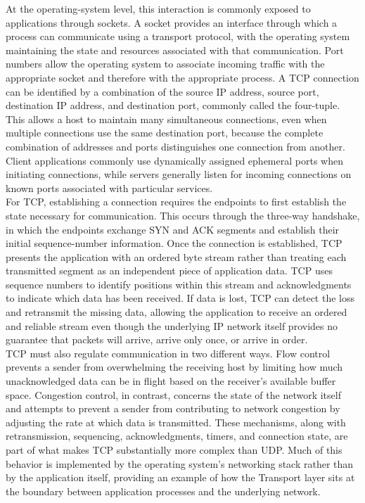 \documentclass[12pt]{article}
\begin{document}
At the operating-system level, this interaction is commonly exposed to applications through sockets. A socket provides an interface through which a process can communicate using a transport protocol, with the operating system maintaining the state and resources associated with that communication. Port numbers allow the operating system to associate incoming traffic with the appropriate socket and therefore with the appropriate process. A TCP connection can be identified by a combination of the source IP address, source port, destination IP address, and destination port, commonly called the four-tuple. This allows a host to maintain many simultaneous connections, even when multiple connections use the same destination port, because the complete combination of addresses and ports distinguishes one connection from another. Client applications commonly use dynamically assigned ephemeral ports when initiating connections, while servers generally listen for incoming connections on known ports associated with particular services.\\

For TCP, establishing a connection requires the endpoints to first establish the state necessary for communication. This occurs through the three-way handshake, in which the endpoints exchange SYN and ACK segments and establish their initial sequence-number information. Once the connection is established, TCP presents the application with an ordered byte stream rather than treating each transmitted segment as an independent piece of application data. TCP uses sequence numbers to identify positions within this stream and acknowledgments to indicate which data has been received. If data is lost, TCP can detect the loss and retransmit the missing data, allowing the application to receive an ordered and reliable stream even though the underlying IP network itself provides no guarantee that packets will arrive, arrive only once, or arrive in order.\\

TCP must also regulate communication in two different ways. Flow control prevents a sender from overwhelming the receiving host by limiting how much unacknowledged data can be in flight based on the receiver's available buffer space. Congestion control, in contrast, concerns the state of the network itself and attempts to prevent a sender from contributing to network congestion by adjusting the rate at which data is transmitted. These mechanisms, along with retransmission, sequencing, acknowledgments, timers, and connection state, are part of what makes TCP substantially more complex than UDP. Much of this behavior is implemented by the operating system's networking stack rather than by the application itself, providing an example of how the Transport layer sits at the boundary between application processes and the underlying network.\\
\end{document}
